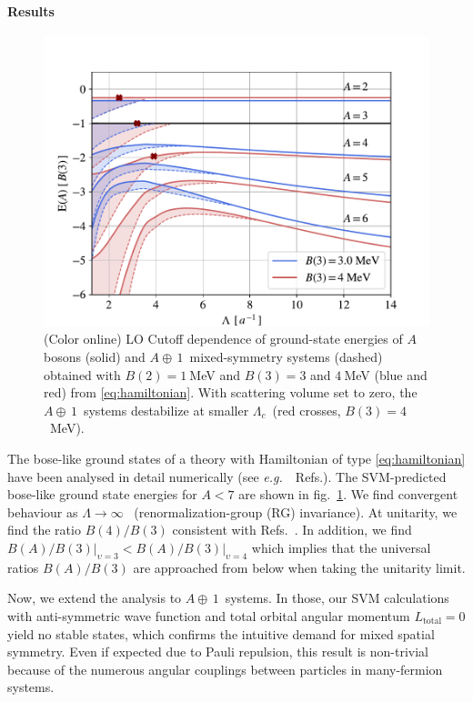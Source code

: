 \documentclass[aps,prl,onecolumn,groupedaddress,superscriptaddress]
{revtex4}
\newcommand{\lc}{\ensuremath{\Lambda_c}}
\newcommand{\abb}{\mbox{\ensuremath{A\oplus\,1}}}
\newcommand{\eg}{\textit{e.g.}~}
\newcommand{\figref}[1]{fig.~\ref{#1}}
\begin{document}
\paragraph*{Results}
%
\begin{figure}
    \centering
        \centering
        \includegraphics[width=\linewidth]{./p-systems-vs-l} 
        \caption{(Color online) LO Cutoff dependence of ground-state energies of $A$ bosons (solid) and \abb~mixed-symmetry systems
        (dashed) obtained with $B(2)=1~$MeV and $B(3)=3$ and $4~$MeV (blue and red) from \eqref{eq:hamiltonian}. With scattering volume set to zero, 
        the \abb~systems destabilize at smaller \lc~(red crosses, $B(3)=4$~MeV).}
        \label{fig:threshold}
\end{figure} 
%
The bose-like ground states of a theory with Hamiltonian of type \eqref{eq:hamiltonian}
have been analysed in detail numerically
(see \eg~Refs.\cite{Bazak:2016wxm,2015PhRvA..92c3626Y,Gattobigio:2012tk,vonStecher:2011zz,Gattobigio:2011ey}).
The SVM-predicted bose-like ground state energies for $A<7$ are shown in \figref{fig:threshold}. 
We find convergent behaviour as $\Lambda\to\infty$%
~(renormalization-group (RG) invariance). At unitarity, we find the ratio $B(4)/B(3)$ consistent with
Refs.~\cite{Hammer:2006ct,2009NatPh...5..417V}.
In addition, we find
\mbox{$B(A)/B(3)\Big\vert_{\upsilon=3}<B(A)/B(3)\Big\vert_{\upsilon=4}$}
which implies that the universal ratios
$B(A)/B(3)$ are approached from below when taking the unitarity limit.

Now, we extend the analysis to \abb~systems.
In those, our SVM calculations with anti-symmetric wave function and
total orbital angular momentum $L_\text{total}=0$ yield no stable states, which confirms the intuitive demand for mixed spatial symmetry.
Even if expected due to Pauli repulsion, this result is non-trivial
because of the numerous angular couplings between particles
in many-fermion systems.
\end{document}

